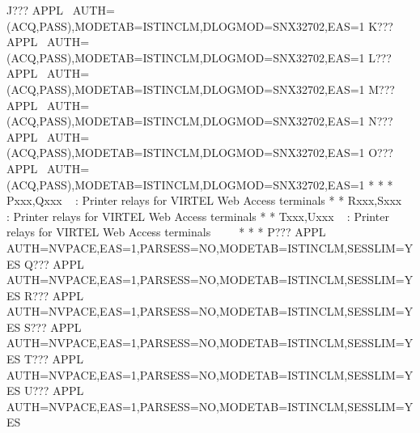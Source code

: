 \documentclass[letterpaper,10pt,english]{sphinxmanual}
\begin{document}
\begin{sphinxVerbatim}[commandchars=\\\{\}]
J??? APPL  AUTH=(ACQ,PASS),MODETAB=ISTINCLM,DLOGMOD=SNX32702,EAS=1
K??? APPL  AUTH=(ACQ,PASS),MODETAB=ISTINCLM,DLOGMOD=SNX32702,EAS=1
L??? APPL  AUTH=(ACQ,PASS),MODETAB=ISTINCLM,DLOGMOD=SNX32702,EAS=1
M??? APPL  AUTH=(ACQ,PASS),MODETAB=ISTINCLM,DLOGMOD=SNX32702,EAS=1
N??? APPL  AUTH=(ACQ,PASS),MODETAB=ISTINCLM,DLOGMOD=SNX32702,EAS=1
O??? APPL  AUTH=(ACQ,PASS),MODETAB=ISTINCLM,DLOGMOD=SNX32702,EAS=1
* \PYGZhy{}\PYGZhy{}\PYGZhy{}\PYGZhy{}\PYGZhy{}\PYGZhy{}\PYGZhy{}\PYGZhy{}\PYGZhy{}\PYGZhy{}\PYGZhy{}\PYGZhy{}\PYGZhy{}\PYGZhy{}\PYGZhy{}\PYGZhy{}\PYGZhy{}\PYGZhy{}\PYGZhy{}\PYGZhy{}\PYGZhy{}\PYGZhy{}\PYGZhy{}\PYGZhy{}\PYGZhy{}\PYGZhy{}\PYGZhy{}\PYGZhy{}\PYGZhy{}\PYGZhy{}\PYGZhy{}\PYGZhy{}\PYGZhy{}\PYGZhy{}\PYGZhy{}\PYGZhy{}\PYGZhy{}\PYGZhy{}\PYGZhy{}\PYGZhy{}\PYGZhy{}\PYGZhy{}\PYGZhy{}\PYGZhy{}\PYGZhy{}\PYGZhy{}\PYGZhy{}\PYGZhy{}\PYGZhy{}\PYGZhy{}\PYGZhy{}\PYGZhy{}\PYGZhy{}\PYGZhy{}\PYGZhy{}\PYGZhy{}\PYGZhy{}\PYGZhy{}\PYGZhy{}\PYGZhy{}\PYGZhy{}\PYGZhy{}\PYGZhy{}\PYGZhy{}\PYGZhy{}\PYGZhy{}*
* Pxxx,Qxxx   : Printer relays for VIRTEL Web Access terminals      *
* Rxxx,Sxxx   : Printer relays for VIRTEL Web Access terminals      *
* Txxx,Uxxx   : Printer relays for VIRTEL Web Access terminals      *
* \PYGZhy{}\PYGZhy{}\PYGZhy{}\PYGZhy{}\PYGZhy{}\PYGZhy{}\PYGZhy{}\PYGZhy{}\PYGZhy{}\PYGZhy{}\PYGZhy{}\PYGZhy{}\PYGZhy{}\PYGZhy{}\PYGZhy{}\PYGZhy{}\PYGZhy{}\PYGZhy{}\PYGZhy{}\PYGZhy{}\PYGZhy{}\PYGZhy{}\PYGZhy{}\PYGZhy{}\PYGZhy{}\PYGZhy{}\PYGZhy{}\PYGZhy{}\PYGZhy{}\PYGZhy{}\PYGZhy{}\PYGZhy{}\PYGZhy{}\PYGZhy{}\PYGZhy{}\PYGZhy{}\PYGZhy{}\PYGZhy{}\PYGZhy{}\PYGZhy{}\PYGZhy{}\PYGZhy{}\PYGZhy{}\PYGZhy{}\PYGZhy{}\PYGZhy{}\PYGZhy{}\PYGZhy{}\PYGZhy{}\PYGZhy{}\PYGZhy{}\PYGZhy{}\PYGZhy{}\PYGZhy{}\PYGZhy{}\PYGZhy{}\PYGZhy{}\PYGZhy{}\PYGZhy{}\PYGZhy{}\PYGZhy{}\PYGZhy{}\PYGZhy{}\PYGZhy{}\PYGZhy{}\PYGZhy{}*
P??? APPL AUTH=NVPACE,EAS=1,PARSESS=NO,MODETAB=ISTINCLM,SESSLIM=YES
Q??? APPL AUTH=NVPACE,EAS=1,PARSESS=NO,MODETAB=ISTINCLM,SESSLIM=YES
R??? APPL AUTH=NVPACE,EAS=1,PARSESS=NO,MODETAB=ISTINCLM,SESSLIM=YES
S??? APPL AUTH=NVPACE,EAS=1,PARSESS=NO,MODETAB=ISTINCLM,SESSLIM=YES
T??? APPL AUTH=NVPACE,EAS=1,PARSESS=NO,MODETAB=ISTINCLM,SESSLIM=YES
U??? APPL AUTH=NVPACE,EAS=1,PARSESS=NO,MODETAB=ISTINCLM,SESSLIM=YES
\end{sphinxVerbatim}

\newpage

\ignorespaces 
\end{document}
